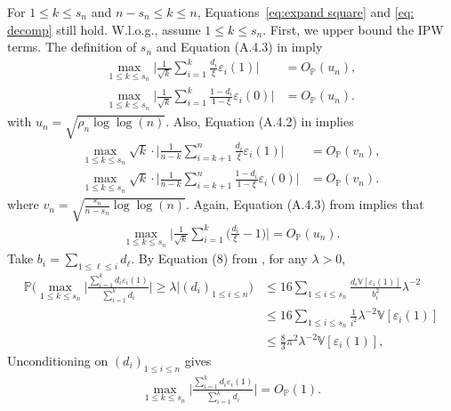 \documentclass[10pt]{article}
\def\P{\mathbb{P}}
\def\V{\mathbb{V}}
\theoremstyle{definition}
\theoremstyle{remark}
\begin{document}
For $1 \leq k \leq s_n$ and $n - s_n \leq k \leq n$, Equations~\eqref{eq:expand square} and \eqref{eq: decomp} still hold.  W.l.o.g., assume $1 \leq k \leq s_n$. First, we upper bound the IPW terms. The definition of $s_n$ and Equation (A.4.3) in \cite{csorgo1997limit} imply
\begin{align}
    \nonumber
    \max_{1 \leq k \leq s_n} \bigg|\frac{1}{\sqrt{k}}\sum_{i = 1}^k \frac{d_i}{\xi}\varepsilon_i(1)\bigg|
    & = O_\P (u_n), \\
    \max_{1 \leq k \leq s_n} \bigg| \frac{1}{\sqrt{k}} \sum_{i =1}^k \frac{1 - d_i}{1 - \xi} \varepsilon_i(0)\bigg|
    & = O_\P (u_n). \label{eq: imbalanced ipw partial sum}
\end{align}
with $u_n = \sqrt{\rho_n \log \log(n)}$. Also, Equation (A.4.2) in \cite{csorgo1997limit} implies
\begin{align}
    \nonumber
    \max_{1 \leq k \leq s_n} \sqrt{k} \cdot
    \bigg|\frac{1}{n-k}\sum_{i = k+1}^n \frac{d_i}{\xi}\varepsilon_i(1)\bigg|
    & = O_\P(v_n), \\
    \max_{1 \leq k \leq s_n} \sqrt{k} \cdot
    \bigg| \frac{1}{n-k} \sum_{i = k+1}^n \frac{1 - d_i}{1 - \xi} \varepsilon_i(0)\bigg|
    & = O_\P(v_n). \label{eq: imbalanced ipw partial sum large}
\end{align}
where $v_n = \sqrt{\frac{s_n}{n - s_n} \log \log (n)}$. Again, Equation (A.4.3) from \cite{csorgo1997limit} implies that
\begin{align*}
    \max_{1 \leq k \leq s_n} \bigg|\frac{1}{\sqrt{k}} \sum_{i = 1}^k \Big(\frac{d_i}{\xi} - 1 \Big) \bigg| = O_\P(u_n).
\end{align*}
Take $b_i = \sum_{1 \leq \ell \leq i} d_\ell$. By Equation (8) from \cite{shorack1976inequalities}, for any $\lambda > 0$, 
\begin{align*}
    \P \bigg(\max_{1 \leq k \leq s_n} \Big|\frac{\sum_{i = 1}^k d_i \varepsilon_i(1)}{\sum_{i =1}^k d_i}\Big| \geq \lambda \bigg| (d_i)_{1 \leq i \leq n}\bigg) & \leq 16 \sum_{1 \leq i \leq s_n} \frac{d_i\mathbb{V}[\varepsilon_i(1)]}{b_i^2} \lambda^{-2} \\
    & \leq 16 \sum_{1 \leq i \leq s_n}\frac{1}{i^2} \lambda^{-2} \V[\varepsilon_i(1)] \\
    & \leq \frac{8}{3}\pi^2 \lambda^{-2} \V[\varepsilon_i(1)],
\end{align*}
Unconditioning on $(d_i)_{1 \leq i \leq n}$ gives
\begin{align*}
    \max_{1 \leq k \leq s_n} \Big|\frac{\sum_{i = 1}^k d_i \varepsilon_i(1)}{\sum_{i =1}^k d_i}\Big| = O_\P(1).
\end{align*}
\end{document}
